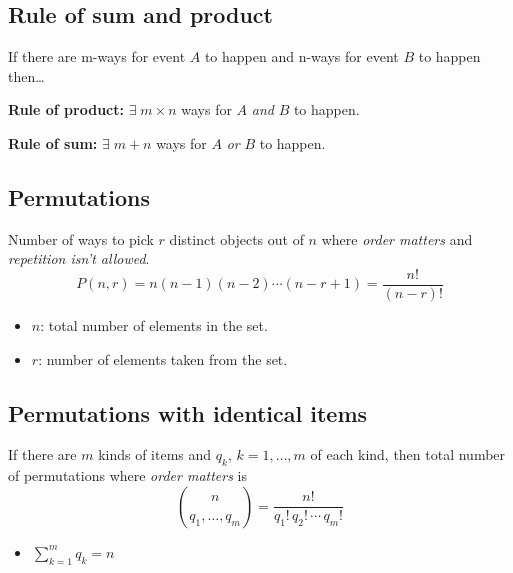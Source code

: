 \subsection{Rule of sum and product}
    \begin{definition}
        If there are m-ways for event $A$ to happen and n-ways for event $B$ to happen then\dots
        \vspace{1em}

        \textbf{Rule of product:} $\exists \; m\times n$ ways for $A$ \emph{and} $B$ to happen. 
        \vspace{1em}

        \textbf{Rule of sum:} $\exists \; m + n$ ways for $A$ \emph{or} $B$ to happen. 
    \end{definition}

\subsection{Permutations}
    \begin{definition}
        Number of ways to pick $r$ distinct objects out of $n$ where \emph{order matters} and \emph{repetition isn't allowed}.
        \begin{equation}
            P(n,r) = n(n-1)(n-2)\cdots(n-r+1) = \frac{n!}{(n-r)!} 
        \end{equation}
        \begin{itemize}
            \item $n$: total number of elements in the set.
            \item $r$: number of elements taken from the set.
        \end{itemize}
    \end{definition}

\subsection{Permutations with identical items}
    \begin{definition}
        If there are $m$ kinds of items and $q_k$, $k=1,\ldots,m$ of each kind, then total number of permutations where \emph{order matters} is 
        \begin{equation}
            \binom{n}{q_1, \ldots, q_m} = \frac{n!}{q_1! \, q_2! \, \cdots \, q_m!}
        \end{equation}
        \begin{itemize}
            \item $\sum_{k=1}^{m} q_k = n$
        \end{itemize}
    \end{definition}


